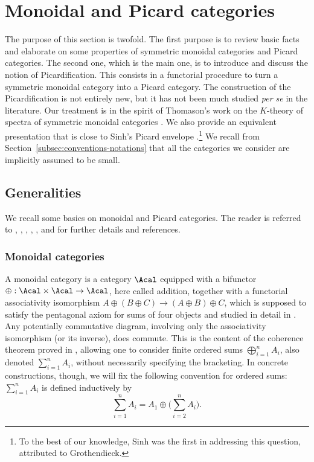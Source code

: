 \section{Monoidal and Picard categories}\label{sec:monoidal-picard}
The purpose of this section is twofold. The first purpose is to review basic facts and elaborate on some properties of symmetric monoidal categories and Picard categories. The second one, which is the main one, is to introduce and discuss the notion of Picardification. This consists in a functorial procedure to turn a symmetric monoidal category into a Picard category. The construction of the Picardification is not entirely new, but it has not been much studied \emph{per se} in the literature. Our treatment is in the spirit of Thomason's work on the $K$-theory of spectra of symmetric monoidal categories \cite{ThomasonSpectral}. We also provide an equivalent presentation that is close to Sinh's Picard envelope \cite{Sinh-these}.\footnote{To the best of our knowledge, Sinh was the first in addressing this question, attributed to Grothendieck.} We recall from Section~\ref{subsec:conventions-notations} that all the categories we consider are implicitly assumed to be small.

\subsection{Generalities}
We recall some basics on monoidal and Picard categories. The reader is referred to \cite[\S 4]{Deligne-determinant}, \cite[App.\,A]{KnudsenMumford}, \cite{MacLane}, \cite{Richter}, \cite{Saavedra}, and \cite{Sinh-these} for further details and references.

\subsubsection{Monoidal categories}\label{subsub:monoidalcategories}
A monoidal category is a category $\Acal$ equipped with a bifunctor $\oplus: \Acal \times \Acal \to \Acal$, here called addition, together with a functorial associativity isomorphism $A\oplus (B \oplus C) \to (A \oplus B) \oplus C$, which is supposed to satisfy the pentagonal axiom for sums of four objects and studied in detail in \cite[p.\,33]{MacLane}. Any potentially commutative diagram, involving only the associativity isomorphism (or its inverse), does commute. This is the content of the coherence theorem proved in \cite[Th.\,3.1]{MacLane}, allowing one to consider finite ordered sums $\bigoplus_{i=1}^{n} A_i$, also denoted $\sum_{i=1}^{n} A_{i}$, without necessarily specifying the bracketing. In concrete constructions, though, we will fix the following convention for ordered sums: $\sum_{i=1}^{n}A_{i}$ is defined inductively by
\begin{equation}\label{eq:convention-sum}
\sum_{i=1}^{n}A_{i}=A_{1}\oplus \biggl(\sum_{i=2}^{n}A_{i}\biggr).
\end{equation}

